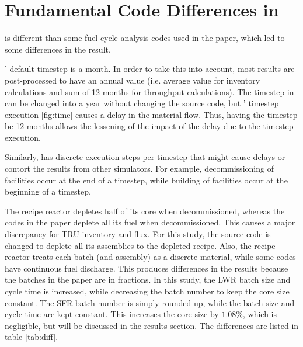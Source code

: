 
\section{Fundamental Code Differences in \Cyclus}

\Cyclus is different than some fuel cycle analysis codes
used in the paper, which led to some differences in the result.

\Cyclus' default timestep is a month. In order to take
this into account, most results are post-processed
to have an annual value (i.e. average value for
inventory calculations and sum of 12 months for
throughput calculations). The timestep in \Cyclus
can be changed into a year without changing the source
code, but \Cyclus' timestep execution \ref{fig:time} causes a delay
in the material flow. Thus, having the timestep be 12 months
allows the lessening of the impact of the delay due to the
\Cyclus timestep execution.

Similarly, \Cyclus has discrete
execution steps per timestep that might cause delays or contort
the results from other simulators. For example, decommissioning of
facilities occur at the end of a timestep, while building of facilities
occur at the beginning of a timestep.

The \Cycamore recipe reactor depletes half of its core when decommissioned,
whereas the codes in the paper deplete all its fuel when decommissioned. This causes a major
discrepancy for \gls{TRU} inventory and flux. For this study, the \Cycamore
source code is changed to deplete all its assemblies to the depleted recipe.
Also, the \Cycamore recipe reactor treats each batch (and assembly) as a discrete
material, while some codes have continuous fuel discharge. This produces
differences in the results because the batches in the paper are in fractions.
In this study, the \gls{LWR} batch size and cycle time is increased, while
decreasing the batch number to keep the core size constant. The \gls{SFR} batch
number is simply rounded up, while the batch size and cycle time are kept constant.
This increases the core size by $1.08 \%$, which is negligible, but will be
discussed in the results section.
The differences are listed in table \ref{tab:diff}.


